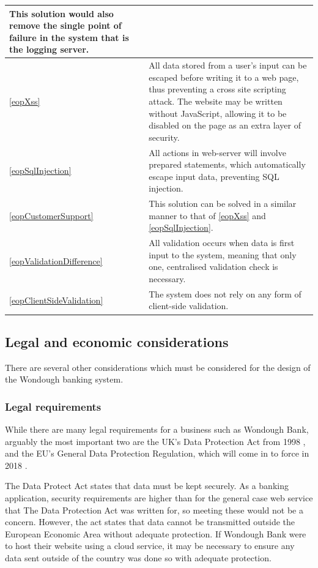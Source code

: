 \begin{longtable}{|| p{} | p{} ||}
        This solution would also remove the single point of failure in the system that is the logging server.
    \\ \hline \ref{eopXss} &
        All data stored from a user's input can be escaped before writing it to a web page, thus preventing a cross site scripting attack. The website may be written without JavaScript, allowing it to be disabled on the page as an extra layer of security.
    \\ \hline \ref{eopSqlInjection} &
        All actions in web-server will involve prepared statements, which automatically escape input data, preventing SQL injection.
    \\ \hline \ref{eopCustomerSupport} &
        This solution can be solved in a similar manner to that of \ref{eopXss} and \ref{eopSqlInjection}.
    \\ \hline \ref{eopValidationDifference} & 
        All validation occurs when data is first input to the system, meaning that only one, centralised validation check is necessary.
    \\ \hline \ref{eopClientSideValidation} &
        The system does not rely on any form of client-side validation.
    \\ \hline

\end{longtable}

\subsection{Legal and economic considerations}

There are several other considerations which must be considered for the design of the Wondough banking system.

\subsubsection{Legal requirements}

While there are many legal requirements for a business such as Wondough Bank, arguably the most important two are the UK's Data Protection Act from 1998 \cite{dataProtectionAct}, and the EU's General Data Protection Regulation, which will come in to force in 2018 \cite{generalDataProtectionRegulation}. 

The Data Protect Act states that data must be kept securely. As a banking application, security requirements are higher than for the general case web service that The Data Protection Act was written for, so meeting these would not be a concern. However, the act states that data cannot be transmitted outside the European Economic Area without adequate protection. If Wondough Bank were to host their website using a cloud service, it may be necessary to ensure any data sent outside of the country was done so with adequate protection.

